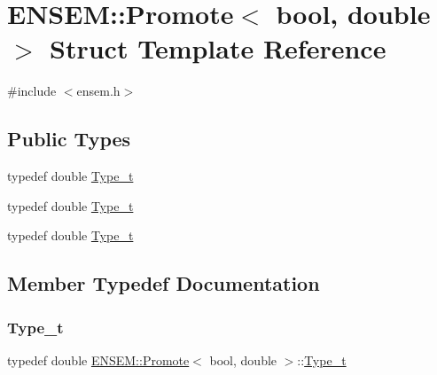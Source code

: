 \hypertarget{structENSEM_1_1Promote_3_01bool_00_01double_01_4}{}\section{E\+N\+S\+EM\+:\+:Promote$<$ bool, double $>$ Struct Template Reference}
\label{structENSEM_1_1Promote_3_01bool_00_01double_01_4}


{\ttfamily \#include $<$ensem.\+h$>$}

\subsection*{Public Types}
\begin{DoxyCompactItemize}
\item 
typedef double \mbox{\hyperlink{structENSEM_1_1Promote_3_01bool_00_01double_01_4_ab5d5c27404016e2042b9c4312b087193}{Type\+\_\+t}}
\item 
typedef double \mbox{\hyperlink{structENSEM_1_1Promote_3_01bool_00_01double_01_4_ab5d5c27404016e2042b9c4312b087193}{Type\+\_\+t}}
\item 
typedef double \mbox{\hyperlink{structENSEM_1_1Promote_3_01bool_00_01double_01_4_ab5d5c27404016e2042b9c4312b087193}{Type\+\_\+t}}
\end{DoxyCompactItemize}


\subsection{Member Typedef Documentation}
\mbox{\label{structENSEM_1_1Promote_3_01bool_00_01double_01_4_ab5d5c27404016e2042b9c4312b087193}} 
\subsubsection{\texorpdfstring{Type\_t}{Type\_t}\hspace{0.1cm}{\footnotesize\ttfamily [1/3]}}
{\footnotesize\ttfamily typedef double \mbox{\hyperlink{structENSEM_1_1Promote}{E\+N\+S\+E\+M\+::\+Promote}}$<$ bool, double $>$\+::\mbox{\hyperlink{structENSEM_1_1Promote_3_01bool_00_01double_01_4_ab5d5c27404016e2042b9c4312b087193}{Type\+\_\+t}}}

